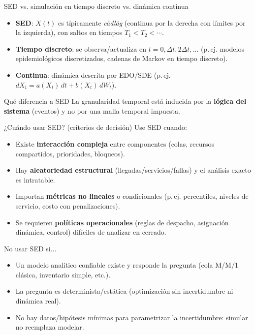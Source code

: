 \documentclass[aspectratio=1610, 9pt]{beamer}
\begin{document}
\begin{frame}{SED vs. simulación en tiempo discreto vs. dinámica continua}
\small
\begin{itemize}
\item \textbf{SED}: $X(t)$ es típicamente \emph{càdlàg} (continua por la derecha con límites por la izquierda), con saltos en tiempos $T_1<T_2<\cdots$.
\item \textbf{Tiempo discreto}: se observa/actualiza en $t=0,\Delta t,2\Delta t,\dots$ (p.\,ej. modelos epidemiológicos discretizados, cadenas de Markov en tiempo discreto).
\item \textbf{Continua}: dinámica descrita por EDO/SDE (p.\,ej. $dX_t = a(X_t)\,dt + b(X_t)\,dW_t$).
\end{itemize}

\vspace{6pt}
\begin{block}{Qué diferencia a SED}
La granularidad temporal está inducida por la \textbf{lógica del sistema} (eventos) y no por una malla temporal impuesta.
\end{block}
\end{frame}

\begin{frame}{¿Cuándo usar SED? (criterios de decisión)}
\small
Use SED cuando:
\begin{itemize}
\item Existe \textbf{interacción compleja} entre componentes (colas, recursos compartidos, prioridades, bloqueos).
\item Hay \textbf{aleatoriedad estructural} (llegadas/servicios/fallas) y el análisis exacto es intratable.
\item Importan \textbf{métricas no lineales} o condicionales (p.\,ej. percentiles, niveles de servicio, costo con penalizaciones).
\item Se requieren \textbf{políticas operacionales} (reglas de despacho, asignación dinámica, control) difíciles de analizar en cerrado.
\end{itemize}

\vspace{6pt}
\begin{alertblock}{No usar SED si...}
\begin{itemize}
\item Un modelo analítico confiable existe y responde la pregunta (cola M/M/1 clásica, inventario simple, etc.).
\item La pregunta es determinista/estática (optimización sin incertidumbre ni dinámica real).
\item No hay datos/hipótesis mínimas para parametrizar la incertidumbre: simular no reemplaza modelar.
\end{itemize}
\end{alertblock}
\end{frame}
\end{document}
